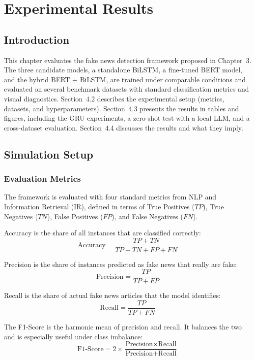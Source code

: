 \sloppy
\chapter{Experimental Results}
\section{Introduction}

This chapter evaluates the fake news detection framework proposed in Chapter~3. The three candidate models, a standalone BiLSTM, a fine-tuned BERT model, and the hybrid BERT + BiLSTM, are trained under comparable conditions and evaluated on several benchmark datasets with standard classification metrics and visual diagnostics. Section~4.2 describes the experimental setup (metrics, datasets, and hyperparameters). Section~4.3 presents the results in tables and figures, including the GRU experiments, a zero-shot test with a local LLM, and a cross-dataset evaluation. Section~4.4 discusses the results and what they imply.

\section{Simulation Setup}

\subsection{Evaluation Metrics}

The framework is evaluated with four standard metrics from NLP and Information Retrieval (IR), defined in terms of True Positives ($TP$), True Negatives ($TN$), False Positives ($FP$), and False Negatives ($FN$).

Accuracy is the share of all instances that are classified correctly:
\[
\text{Accuracy} = \frac{TP + TN}{TP + TN + FP + FN}
\]

Precision is the share of instances predicted as fake news that really are fake:
\[
\text{Precision} = \frac{TP}{TP + FP}
\]

Recall is the share of actual fake news articles that the model identifies:
\[
\text{Recall} = \frac{TP}{TP + FN}
\]

The F1-Score is the harmonic mean of precision and recall. It balances the two and is especially useful under class imbalance:
\[
\text{F1-Score} = 2 \times \frac{\text{Precision} \times \text{Recall}}{\text{Precision} + \text{Recall}}
\]

